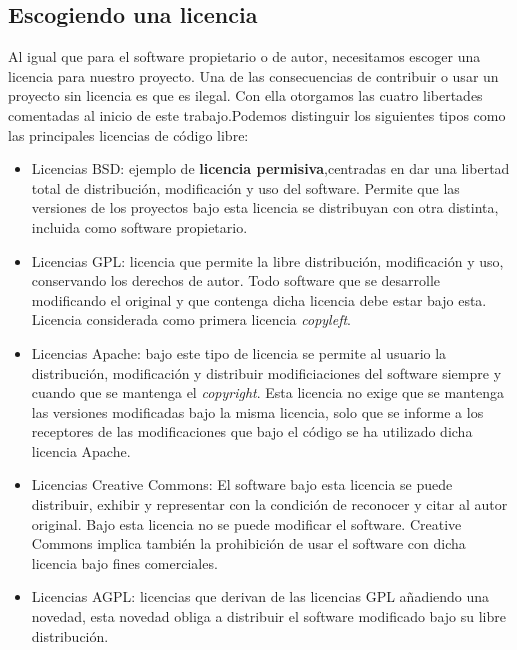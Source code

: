 \subsection*{Escogiendo una licencia}
Al igual que para el software propietario o de autor, necesitamos escoger una licencia para nuestro proyecto. Una de las consecuencias de contribuir o usar un proyecto sin licencia es que es ilegal. Con ella otorgamos las cuatro libertades comentadas al inicio de este trabajo.Podemos distinguir los siguientes tipos como las principales licencias de código libre:
\begin{itemize}
    \item Licencias BSD: ejemplo de \textbf{licencia permisiva},centradas en dar una libertad total de distribución, modificación y uso del software. Permite que las versiones de los proyectos bajo esta licencia se distribuyan con otra distinta, incluida como software propietario.
    \item Licencias GPL: licencia que permite la libre distribución, modificación y uso, conservando los derechos de autor. Todo software que se desarrolle modificando el original y que contenga dicha licencia debe estar bajo esta. Licencia considerada como primera licencia \textit{copyleft}.
    \item Licencias Apache: bajo este tipo de licencia se permite al usuario la distribución, modificación y distribuir modificiaciones del software siempre y cuando que se mantenga el \emph{copyright}. Esta licencia no exige que se mantenga las versiones modificadas bajo la misma licencia, solo que se informe a los receptores de las modificaciones que bajo el código se ha utilizado dicha licencia Apache.
    \item Licencias Creative Commons: El software bajo esta licencia se puede distribuir, exhibir y representar con la condición de reconocer y citar al autor original. Bajo esta licencia no se puede modificar el software. Creative Commons implica también la prohibición de usar el software con dicha licencia bajo fines comerciales. 
    \item Licencias AGPL: licencias que derivan de las licencias GPL añadiendo una novedad, esta novedad obliga a distribuir el software modificado bajo su libre distribución.
\end{itemize}
